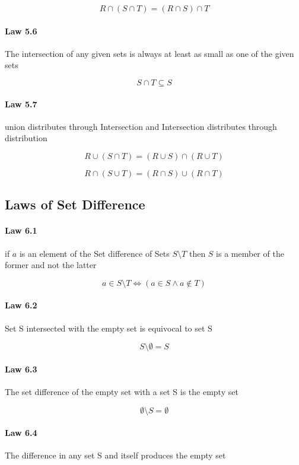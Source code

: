 \documentclass[twocolumn]{article}
\begin{document}
$$ R  \cap  (S  \cap  T) = (R  \cap  S)  \cap  T $$

\paragraph{Law 5.6} The intersection of any given sets is always at least as small as one of the given sets

$$ S \cap T \subseteq S $$

\paragraph{Law 5.7} union distributes through Intersection and Intersection distributes through distribution

$$ R  \cup  (S  \cap  T) = (R  \cup  S)  \cap  (R  \cup  T) $$

$$ R  \cap  (S  \cup  T) = (R  \cap  S)  \cup  (R  \cap  T) $$

\subsection{Laws of Set Difference}

\paragraph{Law 6.1} if $a$ is an element of the Set difference of Sets $S \setminus T$ then $S$ is a member of the former and not the latter

$$ a  \in  S \setminus T \iff (a  \in  S \wedge a \not\in T) $$

\paragraph{Law 6.2} Set S intersected with the empty set is equivocal to set S

$$ S \setminus \emptyset  = S  $$

\paragraph{Law 6.3} The set difference of the empty set with a set S is the empty set

$$  \emptyset \setminus S =  \emptyset  $$

\paragraph{Law 6.4} The difference in any set S and itself produces the empty set
\end{document}
